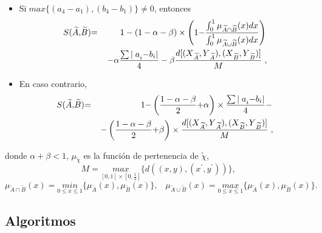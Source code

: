 \documentclass[spanish,12pt, a4paper, twoside]{paper}
\begin{document}
\begin{itemize}
\item Si$\;{max} \{(a_{4}-a_{1}),(b_{4}-b_{1})\}\neq 0$, entonces
\begin{eqnarray*}
{\small S(}\widetilde{A}{\small ,}\widetilde{B}{\small )} &{\small =}&%
\left. {\small 1-(1-\alpha -\beta })\times \left ( {\small 1-}\frac{\int_{0}^{1}%
{\small \mu }_{\widetilde{A}\cap \widetilde{B}}{\small (x)dx}}{\int_{0}^{1}%
{\small \mu }_{\widetilde{A}\cup \widetilde{B}}{\small (x)dx}}\right)
\right.  \\
&&\left. -{\small \alpha } \frac{\sum {\small \mid a}_{i}{\small -b}_{i}%
{\small \mid }}{{\small 4}}-{\small \beta }\frac{{\small d[(X}_{\widetilde{A}%
}{\small ,Y}_{\widetilde{A}}{\small ),(X}_{\widetilde{B}}{\small ,Y}_{%
\widetilde{B}}{\small )]}}{{\small M}}\right., 
\end{eqnarray*}

\item En caso contrario,%
\begin{eqnarray*}
{\small S(}\widetilde{A}{\small ,}\widetilde{B}{\small )} &{\small =}&%
\left. {\small 1-}%
\left( \frac{{\small 1-\alpha -\beta }}{{\small 2}}{\small +\alpha } \right) \times
\frac{\sum {\small \mid a}_{i}{\small -b}_{i}{\small \mid }}{{\small 4}}%
{\small -}\right.  \\
&&\left. {\small -}\left( \frac{{\small 1-\alpha -\beta }}{{\small 2}}%
{\small +\beta }\right)\times \frac{{\small d[(X}_{\widetilde{A}}{\small ,Y}_{%
\widetilde{A}}{\small ),(X}_{\widetilde{B}}{\small ,Y}_{\widetilde{B}}%
{\small )]}}{{\small M}}\right., 
\end{eqnarray*}
\end{itemize}
donde $\alpha +\beta <1$, $\mu _{\widetilde{\chi }}$ es la función de pertenencia de $\widetilde{\chi}$, 
\begin{equation}
M=\underset{[0,1]\times[0,\frac{1}{2}]}{max}\{d((x,y),(x^{\prime },y^{\prime }))\}\text{,} 
\end{equation}%
\begin{equation*}
\mu _{\widetilde{A}\cap \widetilde{B}}(x)=\underset{0\leq x\leq 1}{min}%
\{\mu _{\widetilde{A}}(x),\mu _{\widetilde{B}}(x)\} ,
\;\;\; \mu _{\widetilde{A}\cup \widetilde{B}}(x)=\underset{0\leq x\leq 1}{max}%
\{\mu _{\widetilde{A}}(x),\mu _{\widetilde{B}}(x)\}.
\end{equation*}%

\subsection{Algoritmos}
\end{document}
